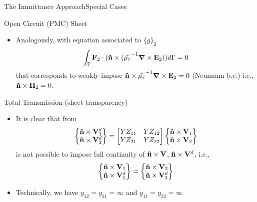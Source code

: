 \begin{frame}[allowframebreaks]{The Immittance Approach}{Special Cases}
\begin{block}{Open Circuit (PMC) Sheet}
\begin{itemize}
    \item Analogously, with equation associated to
      $\lbrace g\rbrace_2$
      \begin{equation*}
        \int_{\Gamma} \mathbf{F}_2\cdot(\mathbf{\hat{n}} \times ( {\bar{\bar{\mu_r}}}^{-1} \boldsymbol{\nabla} \times \mathbf{E}_2 )) d\Gamma = 0
      \end{equation*}
      that corresponds to weakly impose
      $\mathbf{\hat{n}}\times{\bar{\bar{\mu_r}}}^{-1}\boldsymbol{\nabla}\times\mathbf{E}_2=0$ (Neumann b.c.)  i.e.,
      $\mathbf{\hat{n}}\times\mathbf{H}_2=0$.
    \end{itemize}
  \end{block}
  
  \framebreak  %
  
  \begin{block}{Total Transmission (sheet transparency)}
    \begin{itemize}
    \item It is clear that from
      \begin{equation*}
        \begin{Bmatrix}
          \mathbf{\hat{n}}\times\mathbf{V}^d_1 \\ \mathbf{\hat{n}}\times\mathbf{V}^d_2
        \end{Bmatrix} =
        \begin{bmatrix}
          YZ_{11} & YZ_{12} \\ YZ_{21}  & YZ_{22}
        \end{bmatrix}
        \begin{Bmatrix}
          \mathbf{\hat{n}}\times\mathbf{V}_1 \\ \mathbf{\hat{n}}\times\mathbf{V}_2
        \end{Bmatrix} 
      \end{equation*}
      is not possible to impose full continuity of $\mathbf{\hat{n}}\times\mathbf{V}$,
      $\mathbf{\hat{n}}\times\mathbf{V}^d$, i.e., 
      \begin{equation*}
        \begin{Bmatrix}
          \mathbf{\hat{n}}\times\mathbf{V}_1 \\ \mathbf{\hat{n}}\times\mathbf{V}^d_1
        \end{Bmatrix} =
        \begin{Bmatrix}
          \mathbf{\hat{n}}\times\mathbf{V}_2 \\ \mathbf{\hat{n}}\times\mathbf{V}^d_2
        \end{Bmatrix} 
      \end{equation*}
      
    \item Technically, we have $y_{12}=y_{21}=\infty$ and $y_{11}=y_{22}=\infty$
      

\end{itemize}
\end{block}
\end{frame}
